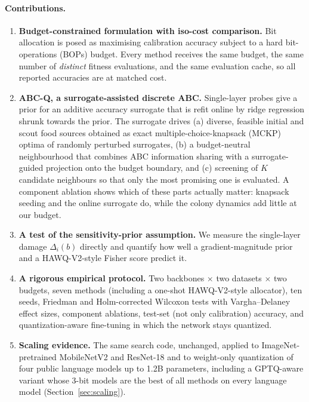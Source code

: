 \documentclass[11pt,a4paper]{article}
\begin{document}
\paragraph{Contributions.}
\begin{enumerate}
\item \textbf{Budget-constrained formulation with iso-cost comparison.} Bit allocation is posed as
      maximising calibration accuracy subject to a hard bit-operations (BOPs) budget. Every method
      receives the same budget, the same number of \emph{distinct} fitness evaluations, and the same
      evaluation cache, so all reported accuracies are at matched cost.
\item \textbf{ABC-Q, a surrogate-assisted discrete ABC.} Single-layer probes give a prior for an
      additive accuracy surrogate that is refit online by ridge regression shrunk towards the prior.
      The surrogate drives (a) diverse, feasible initial and scout food sources obtained as exact
      multiple-choice-knapsack (MCKP) optima of randomly perturbed surrogates, (b) a budget-neutral
      neighbourhood that combines ABC information sharing with a surrogate-guided projection onto the
      budget boundary, and (c) screening of $K$ candidate neighbours so that only the most promising
      one is evaluated. A component ablation shows which of these parts actually matter: knapsack
      seeding and the online surrogate do, while the colony dynamics add little at our budget.
\item \textbf{A test of the sensitivity-prior assumption.} We measure the single-layer damage
      $\Delta_i(b)$ directly and quantify how well a gradient-magnitude prior and a HAWQ-V2-style Fisher
      score predict it.
\item \textbf{A rigorous empirical protocol.} Two backbones $\times$ two datasets $\times$ two
      budgets, seven methods (including a one-shot HAWQ-V2-style allocator), ten seeds, Friedman and
      Holm-corrected Wilcoxon tests with Vargha--Delaney effect sizes, component ablations, test-set
      (not only calibration) accuracy, and quantization-aware fine-tuning in which the network stays
      quantized.
\item \textbf{Scaling evidence.} The same search code, unchanged, applied to ImageNet-pretrained
      MobileNetV2 and ResNet-18 and to weight-only quantization of four public language models up to
      1.2B parameters, including a GPTQ-aware variant whose 3-bit models are the best of all methods
      on every language model (Section~\ref{sec:scaling}).
\end{enumerate}
\end{document}
